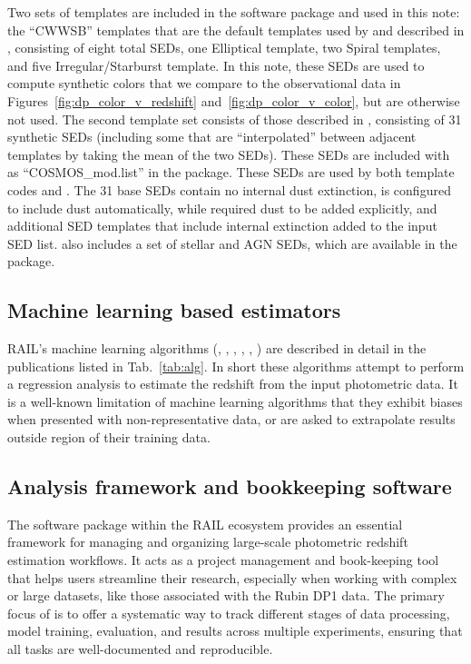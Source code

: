 Two sets of templates are included in the  software package and used in this note: the ``CWWSB'' templates that are the default templates used by  and described in \citet[]{Coe:06}, consisting of eight total SEDs, one Elliptical template, two Spiral templates, and five Irregular/Starburst template.  In this note, these SEDs are used to compute synthetic colors that we compare to the observational data in Figures~\ref{fig:dp_color_v_redshift} and~\ref{fig:dp_color_v_color}, but are otherwise not used.  The second template set consists of those described in \citet[]{Ilbert:09}, consisting of 31 synthetic SEDs (including some that are ``interpolated'' between adjacent templates by taking the mean of the two SEDs).  These SEDs are included with  as ``COSMOS\_mod.list'' in the  package.  These SEDs are used by both template codes  and .  The 31 base SEDs contain no internal dust extinction,  is configured to include dust automatically, while  required dust to be added explicitly, and additional SED templates that include internal extinction added to the input SED list.  also includes a set of stellar and AGN SEDs, which are available in the  package.


\subsection{Machine learning based estimators}
\label{sec:method:machine_learning}

RAIL’s machine learning algorithms (, , , , , ) are described in detail in the publications listed in Tab.~\ref{tab:alg}.  In short these algorithms attempt to perform a regression analysis to estimate the redshift from the input photometric data.   It is a well-known limitation of machine learning algorithms that they exhibit biases when presented with non-representative data, or are asked to extrapolate results outside region of their training data.


\subsection{Analysis framework and bookkeeping software}
\label{sec:method:rail_project}

The  software package within the RAIL ecosystem provides an essential framework for managing and organizing large-scale photometric redshift estimation workflows.  It acts as a project management and book-keeping tool that helps users streamline their research, especially when working with complex or large datasets, like those associated with the Rubin DP1 data.  The primary focus of  is to offer a systematic way to track different stages of data processing, model training, evaluation, and results across multiple experiments, ensuring that all tasks are well-documented and reproducible.

